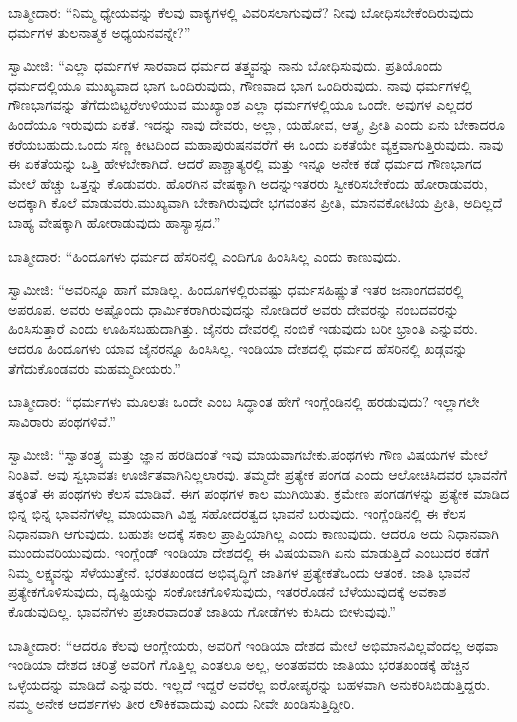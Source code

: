 ಬಾತ್ಮೀದಾರ: “ನಿಮ್ಮ ಧ್ಯೇಯವನ್ನು ಕೆಲವು ವಾಕ್ಯಗಳಲ್ಲಿ ವಿವರಿಸಲಾಗುವುದೆ? ನೀವು ಬೋಧಿಸಬೇಕೆಂದಿರುವುದು ಧರ್ಮಗಳ ತುಲನಾತ್ಮಕ ಅಧ್ಯಯನವನ್ನೇ?”

ಸ್ವಾಮೀಜಿ: “ಎಲ್ಲಾ ಧರ್ಮಗಳ ಸಾರವಾದ ಧರ್ಮದ ತತ್ತ್ವವನ್ನು ನಾನು ಬೋಧಿಸುವುದು. ಪ್ರತಿಯೊಂದು ಧರ್ಮದಲ್ಲಿಯೂ ಮುಖ್ಯವಾದ ಭಾಗ ಒಂದಿರುವುದು, ಗೌಣವಾದ ಭಾಗ ಒಂದಿರುವುದು. ನಾವು ಧರ್ಮಗಳಲ್ಲಿ ಗೌಣಭಾಗವನ್ನು ತೆಗೆದುಬಿಟ್ಟರೆ\break ಉಳಿಯುವ ಮುಖ್ಯಾಂಶ ಎಲ್ಲಾ ಧರ್ಮಗಳಲ್ಲಿಯೂ ಒಂದೇ. ಅವುಗಳ ಎಲ್ಲದರ ಹಿಂದೆಯೂ ಇರುವುದು ಏಕತೆ. ಇದನ್ನು ನಾವು ದೇವರು, ಅಲ್ಲಾ, ಯಹೋವ, ಆತ್ಮ, ಪ್ರೀತಿ ಎಂದು ಏನು ಬೇಕಾದರೂ ಕರೆಯಬಹುದು.ಒಂದು ಸಣ್ಣ ಕೀಟದಿಂದ ಮಹಾ\-ಪುರುಷನವರೆಗೆ ಈ ಒಂದು ಏಕತೆಯೇ ವ್ಯಕ್ತವಾಗುತ್ತಿರುವುದು. ನಾವು ಈ ಏಕತೆಯನ್ನು ಒತ್ತಿ ಹೇಳಬೇಕಾಗಿದೆ. ಆದರೆ ಪಾಶ್ಚಾತ್ಯರಲ್ಲಿ ಮತ್ತು ಇನ್ನೂ ಅನೇಕ ಕಡೆ ಧರ್ಮದ ಗೌಣಭಾಗದ ಮೇಲೆ ಹೆಚ್ಚು ಒತ್ತನ್ನು ಕೊಡುವರು. ಹೊರಗಿನ ವೇಷಕ್ಕಾಗಿ ಅದನ್ನು\break ಇತರರು ಸ್ವೀಕರಿಸಬೇಕೆಂದು ಹೋರಾಡುವರು, ಅದಕ್ಕಾಗಿ ಕೊಲೆ ಮಾಡುವರು.\break ಮುಖ್ಯವಾಗಿ ಬೇಕಾಗಿರುವುದೇ ಭಗವಂತನ ಪ್ರೀತಿ, ಮಾನವಕೋಟಿಯ ಪ್ರೀತಿ, ಅದಿಲ್ಲದೆ ಬಾಹ್ಯ ವೇಷಕ್ಕಾಗಿ ಹೋರಾಡುವುದು ಹಾಸ್ಯಾಸ್ಪದ.”

\vskip 0.1cm

ಬಾತ್ಮೀದಾರ: “ಹಿಂದೂಗಳು ಧರ್ಮದ ಹೆಸರಿನಲ್ಲಿ ಎಂದಿಗೂ ಹಿಂಸಿಸಿಲ್ಲ ಎಂದು ಕಾಣುವುದು.

\vskip 0.1cm

ಸ್ವಾಮೀಜಿ: “ಅವರಿನ್ನೂ ಹಾಗೆ ಮಾಡಿಲ್ಲ. ಹಿಂದೂಗಳಲ್ಲಿರುವಷ್ಟು ಧರ್ಮಸಹಿಷ್ಣುತೆ ಇತರ ಜನಾಂಗದವರಲ್ಲಿ ಅಪರೂಪ. ಅವರು ಅಷ್ಟೊಂದು ಧಾರ್ಮಿಕರಾಗಿರುವುದನ್ನು ನೋಡಿದರೆ ಅವರು ದೇವರನ್ನು ನಂಬದವರನ್ನು ಹಿಂಸಿಸುತ್ತಾರೆ ಎಂದು ಊಹಿಸಬಹುದಾಗಿತ್ತು. ಜೈನರು ದೇವರಲ್ಲಿ ನಂಬಿಕೆ ಇಡುವುದು ಬರೀ ಭ್ರಾಂತಿ ಎನ್ನುವರು. ಆದರೂ ಹಿಂದೂಗಳು ಯಾವ ಜೈನರನ್ನೂ ಹಿಂಸಿಸಿಲ್ಲ. ಇಂಡಿಯಾ ದೇಶದಲ್ಲಿ ಧರ್ಮದ ಹೆಸರಿನಲ್ಲಿ ಖಡ್ಗವನ್ನು ತೆಗೆದುಕೊಂಡವರು ಮಹಮ್ಮದೀಯರು.”

ಬಾತ್ಮೀದಾರ: “ಧರ್ಮಗಳು ಮೂಲತಃ ಒಂದೇ ಎಂಬ ಸಿದ್ಧಾಂತ ಹೇಗೆ ಇಂಗ್ಲೆಂಡಿನಲ್ಲಿ ಹರಡುವುದು? ಇಲ್ಲಾಗಲೇ ಸಾವಿರಾರು ಪಂಥಗಳಿವೆ.”

ಸ್ವಾಮೀಜಿ: “ಸ್ವಾತಂತ್ರ್ಯ ಮತ್ತು ಜ್ಞಾನ ಹರಡಿದಂತೆ ಇವು ಮಾಯವಾಗಬೇಕು.\break ಪಂಥಗಳು ಗೌಣ ವಿಷಯಗಳ ಮೇಲೆ ನಿಂತಿವೆ. ಅವು ಸ್ವಭಾವತಃ ಊರ್ಜಿತವಾಗಿ\break ನಿಲ್ಲಲಾರವು. ತಮ್ಮದೇ ಪ್ರತ್ಯೇಕ ಪಂಗಡ ಎಂದು ಆಲೋಚಿಸಿದವರ ಭಾವನೆಗೆ ತಕ್ಕಂತೆ ಈ ಪಂಥಗಳು ಕೆಲಸ ಮಾಡಿವೆ. ಈಗ ಪಂಥಗಳ ಕಾಲ ಮುಗಿಯಿತು. ಕ್ರಮೇಣ ಪಂಗಡಗಳನ್ನು ಪ್ರತ್ಯೇಕ ಮಾಡಿದ ಭಿನ್ನ ಭಿನ್ನ ಭಾವನೆಗಳೆಲ್ಲ ಮಾಯವಾಗಿ ವಿಶ್ವ ಸಹೋದರತ್ವದ ಭಾವನೆ ಬರುವುದು. ಇಂಗ್ಲೆಂಡಿನಲ್ಲಿ ಈ ಕೆಲಸ ನಿಧಾನವಾಗಿ ಆಗುವುದು. ಬಹುಶಃ ಅದಕ್ಕೆ ಸಕಾಲ ಪ್ರಾಪ್ತಿಯಾಗಿಲ್ಲ ಎಂದು ಕಾಣುವುದು. ಆದರೂ ಅದು ನಿಧಾನವಾಗಿ ಮುಂದುವರಿಯುವುದು. ಇಂಗ್ಲೆಂಡ್​ ಇಂಡಿಯಾ ದೇಶದಲ್ಲಿ ಈ ವಿಷಯವಾಗಿ ಏನು ಮಾಡುತ್ತಿದೆ ಎಂಬುದರ ಕಡೆಗೆ ನಿಮ್ಮ ಲಕ್ಷ್ಯವನ್ನು ಸೆಳೆಯುತ್ತೇನೆ. ಭರತಖಂಡದ ಅಭಿವೃದ್ಧಿಗೆ ಜಾತಿಗಳ ಪ್ರತ್ಯೇಕತೆ\break ಒಂದು ಆತಂಕ. ಜಾತಿ ಭಾವನೆ ಪ್ರತ್ಯೇಕಗೊಳಿಸುವುದು, ದೃಷ್ಟಿಯನ್ನು ಸಂಕೋಚಗೊಳಿಸುವುದು, ಇತರರೊಡನೆ ಬೆಳೆಯುವುದಕ್ಕೆ ಅವಕಾಶ ಕೊಡುವುದಿಲ್ಲ. ಭಾವನೆಗಳು ಪ್ರಚಾರ\-ವಾದಂತೆ ಜಾತಿಯ ಗೋಡೆಗಳು ಕುಸಿದು ಬೀಳುವುವು.”

ಬಾತ್ಮೀದಾರ: “ಆದರೂ ಕೆಲವು ಆಂಗ್ಲೇಯರು, ಅವರಿಗೆ ಇಂಡಿಯಾ ದೇಶದ ಮೇಲೆ ಅಭಿಮಾನವಿಲ್ಲವೆಂದಲ್ಲ ಅಥವಾ ಇಂಡಿಯಾ ದೇಶದ ಚರಿತ್ರೆ ಅವರಿಗೆ ಗೊತ್ತಿಲ್ಲ ಎಂತಲೂ ಅಲ್ಲ, ಅಂತಹವರು ಜಾತಿಯು ಭರತಖಂಡಕ್ಕೆ ಹೆಚ್ಚಿನ ಒಳ್ಳೆಯದನ್ನು ಮಾಡಿದೆ ಎನ್ನುವರು. ಇಲ್ಲದೆ ಇದ್ದರೆ ಅವರೆಲ್ಲ ಐರೋಪ್ಯರನ್ನು ಬಹಳವಾಗಿ ಅನುಕರಿಸಿಬಿಡುತ್ತಿದ್ದರು. ನಮ್ಮ ಅನೇಕ ಆದರ್ಶಗಳು ತೀರ ಲೌಕಿಕವಾದುವು ಎಂದು ನೀವೇ ಖಂಡಿಸುತ್ತಿದ್ದೀರಿ.

